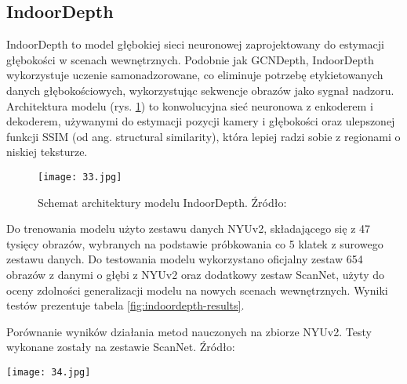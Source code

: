 \subsection{IndoorDepth}
IndoorDepth \cite{fan2023deeper} to model głębokiej sieci neuronowej zaprojektowany do estymacji głębokości w scenach wewnętrznych. Podobnie jak GCNDepth, IndoorDepth wykorzystuje uczenie samonadzorowane, co eliminuje potrzebę etykietowanych danych głębokościowych, wykorzystując sekwencje obrazów jako sygnał nadzoru. Architektura modelu (rys. \ref{fig:indoordepth-architecture}) to konwolucyjna sieć neuronowa z enkoderem i dekoderem, używanymi do estymacji pozycji kamery i głębokości oraz ulepszonej funkcji SSIM (od ang. structural similarity), która lepiej radzi sobie z regionami o niskiej teksturze.
\begin{figure}[H]
    \centering
    \texttt{[image: 33.jpg]}
    \caption{Schemat architektury modelu IndoorDepth. Źródło: \cite{fan2023deeper}}
    \label{fig:indoordepth-architecture}
\end{figure}
Do trenowania modelu użyto zestawu danych NYUv2, składającego się z 47 tysięcy obrazów, wybranych na podstawie próbkowania co 5 klatek z surowego zestawu danych. Do testowania modelu wykorzystano oficjalny zestaw 654 obrazów z danymi o głębi z NYUv2 oraz dodatkowy zestaw ScanNet, użyty do oceny zdolności generalizacji modelu na nowych scenach wewnętrznych. Wyniki testów prezentuje tabela \ref{fig:indoordepth-results}.
\begin{table}[H]
    \centering
    \caption{Porównanie wyników działania metod nauczonych na zbiorze NYUv2. Testy wykonane zostały na zestawie ScanNet. Źródło: \cite{fan2023deeper}}
    \texttt{[image: 34.jpg]}
    \label{fig:indoordepth-results}
\end{table}

